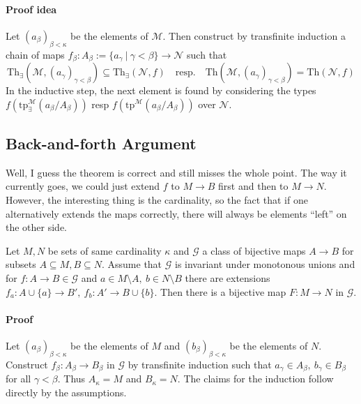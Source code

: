 \documentclass{scrartcl}
\begin{document}
\paragraph{Proof idea} Let $(a_\beta)_{\beta < \kappa}$ be the elements of $\mathcal{M}$. 
Then construct by transfinite induction a chain of maps $f_\beta: A_\beta := \{a_\gamma \ | \ \gamma < \beta\} \to \mathcal{N}$ such that
\begin{equation*}
    \mathrm{Th}_\exists(\mathcal{M}, (a_\gamma)_{\gamma < \beta}) \subseteq \mathrm{Th}_\exists(\mathcal{N}, f) \quad \text{resp.} \quad \mathrm{Th}(\mathcal{M}, (a_\gamma)_{\gamma < \beta}) = \mathrm{Th}(\mathcal{N}, f)
\end{equation*}
In the inductive step, the next element is found by considering the types $f(\mathrm{tp}_\exists^{\mathcal{M}}(a_\beta / A_\beta))$ resp $f(\mathrm{tp}^{\mathcal{M}}(a_\beta / A_\beta))$ over $\mathcal{N}$.

\subsection{Back-and-forth Argument}
\begin{center}
    Well, I guess the theorem is correct and still misses the whole point.
    The way it currently goes, we could just extend $f$ to $M \to B$ first and then to $M \to N$.
    However, the interesting thing is the cardinality, so the fact that if one alternatively extends the maps correctly, there will always be elements ``left'' on the other side.
\end{center}
\label{back_and_forth}
Let $M, N$ be sets of same cardinality $\kappa$ and $\mathcal{G}$ a class of bijective maps $A \to B$ for subsets $A \subseteq M, B \subseteq N$.
Assume that $\mathcal{G}$ is invariant under monotonous unions and for $f: A \to B \in \mathcal{G}$ and $a \in M \setminus A, \ b \in N \setminus B$ there are extensions $f_a: A \cup \{a\} \to B', \ f_b: A' \to B \cup \{b\}$.
Then there is a bijective map $F: M \to N$ in $\mathcal{G}$.

\paragraph{Proof} Let $(a_\beta)_{\beta < \kappa}$ be the elements of $M$ and $(b_\beta)_{\beta < \kappa}$ be the elements of $N$.
Construct $f_\beta: A_\beta \to B_\beta$ in $\mathcal{G}$ by transfinite induction such that $a_\gamma \in A_\beta, \ b_\gamma \in B_\beta$ for all $\gamma < \beta$.
Thus $A_\kappa = M$ and $B_\kappa = N$. The claims for the induction follow directly by the assumptions.
\end{document}
